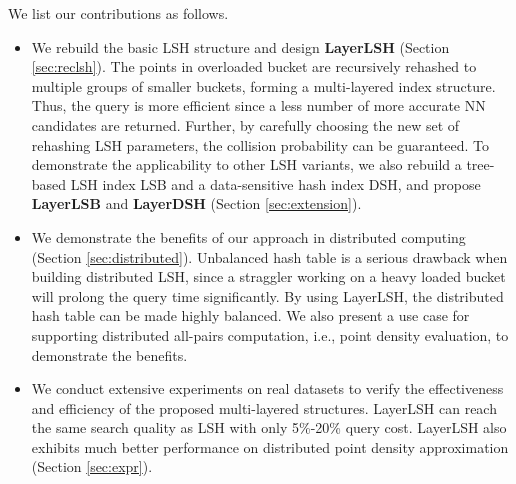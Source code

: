  We list our contributions as follows.
\begin{itemize}
\item We rebuild the basic LSH structure and design \textbf{LayerLSH} (Section \ref{sec:reclsh}). The points in overloaded bucket are recursively rehashed to multiple groups of smaller buckets, forming a multi-layered index structure. Thus, the query is more efficient since a less number of more accurate NN candidates are returned. Further, by carefully choosing the new set of rehashing LSH parameters, the collision probability can be guaranteed. To demonstrate the applicability to other LSH variants, we also rebuild a tree-based LSH index LSB and a data-sensitive hash index DSH, and propose \textbf{LayerLSB} and \textbf{LayerDSH} (Section \ref{sec:extension}).
  \item We demonstrate the benefits of our approach in distributed computing (Section \ref{sec:distributed}). Unbalanced hash table is a serious drawback when building distributed LSH, since a straggler working on a heavy loaded bucket will prolong the query time significantly. By using LayerLSH, the distributed hash table can be made highly balanced. We also present a use case for supporting distributed all-pairs computation, i.e., point density evaluation, to demonstrate the benefits.
  \item We conduct extensive experiments on real datasets to verify the effectiveness and efficiency of the proposed multi-layered structures. LayerLSH can reach the same search quality as LSH with only 5\%-20\% query cost. LayerLSH also exhibits much better performance on distributed point density approximation (Section \ref{sec:expr}).
\end{itemize}

